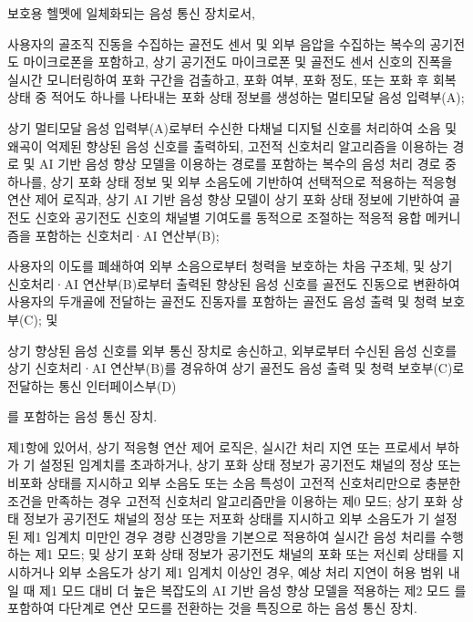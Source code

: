 \documentclass{article}
\DeclareRobustCommand{\codexedit}[1]{\textcolor{customorange}{#1}}
\DeclareRobustCommand{\vtwoedit}[1]{\textcolor{customgreen}{#1}}
\begin{document}
\begin{enumerate}[label=\textbf{[\arabic*]}]


    \item 보호용 헬멧에 일체화되는 음성 통신 장치로서,

    \vtwoedit{사용자의 골조직 진동을 수집하는 골전도 센서 및 외부 음압을 수집하는 복수의 공기전도 마이크로폰을 포함하고, 상기 공기전도 마이크로폰 및 골전도 센서 신호의 진폭을 실시간 모니터링하여 포화 구간을 검출하고, 포화 여부, 포화 정도, 또는 포화 후 회복 상태 중 적어도 하나를 나타내는 포화 상태 정보를 생성하는 멀티모달 음성 입력부(A);}

    \codexedit{상기 멀티모달 음성 입력부(A)로부터 수신한 다채널 디지털 신호를 처리하여 소음 및 왜곡이 억제된 향상된 음성 신호를 출력하되, 고전적 신호처리 알고리즘을 이용하는 경로 및 AI 기반 음성 향상 모델을 이용하는 경로를 포함하는 복수의 음성 처리 경로 중 하나를, \vtwoedit{상기 포화 상태 정보} 및 외부 소음도에 기반하여 선택적으로 적용하는 적응형 연산 제어 로직과, 상기 AI 기반 음성 향상 모델이 \vtwoedit{상기 포화 상태 정보}에 기반하여 골전도 신호와 공기전도 신호의 채널별 기여도를 동적으로 조절하는 적응적 융합 메커니즘을 포함하는 신호처리·AI 연산부(B);}

    사용자의 이도를 폐쇄하여 외부 소음으로부터 청력을 보호하는 차음 구조체, 및 상기 신호처리·AI 연산부(B)로부터 출력된 향상된 음성 신호를 골전도 진동으로 변환하여 사용자의 두개골에 전달하는 골전도 진동자를 포함하는 골전도 음성 출력 및 청력 보호부(C); 및

    상기 향상된 음성 신호를 외부 통신 장치로 송신하고, 외부로부터 수신된 음성 신호를 상기 신호처리·AI 연산부(B)를 경유하여 상기 골전도 음성 출력 및 청력 보호부(C)로 전달하는 통신 인터페이스부(D)

    를 포함하는 음성 통신 장치.


    \item \codexedit{제1항에 있어서,
    상기 적응형 연산 제어 로직은,
    \vtwoedit{실시간 처리 지연 또는 프로세서 부하가 기 설정된 임계치를 초과하거나, 상기 포화 상태 정보가 공기전도 채널의 정상 또는 비포화 상태를 지시하고 외부 소음도 또는 소음 특성이 고전적 신호처리만으로 충분한 조건을 만족하는 경우 고전적 신호처리 알고리즘만을 이용하는 제0 모드;}
    \vtwoedit{상기 포화 상태 정보가 공기전도 채널의 정상 또는 저포화 상태를 지시하고 외부 소음도가 기 설정된 제1 임계치 미만인 경우 경량 신경망을 기본으로 적용하여 실시간 음성 처리를 수행하는 제1 모드; 및}
    \vtwoedit{상기 포화 상태 정보가 공기전도 채널의 포화 또는 저신뢰 상태를 지시하거나 외부 소음도가 상기 제1 임계치 이상인 경우, 예상 처리 지연이 허용 범위 내일 때 제1 모드 대비 더 높은 복잡도의 AI 기반 음성 향상 모델을 적용하는 제2 모드}
    를 포함하여 다단계로 연산 모드를 전환하는 것을 특징으로 하는 음성 통신 장치.}


\end{enumerate}
\end{document}
